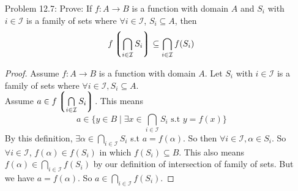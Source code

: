 \documentclass{article}
\theoremstyle{claim}
\theoremstyle{definition}
\begin{document}
\begin{enumerate}
\begin{enumerate}
\begin{proof}
                \end{proof}
            \item Prove that if $T_1 \subseteq T_2$, then $f^{-1}(T_1) \subseteq f^{-1}(T_2)$.
                \begin{proof}
                    Let $f: A \rightarrow B$ be a function. Let $T_1, T_2 \subseteq B$.\\
                    Assume $T_1 \subseteq T_2$. We want to show: If $x \in f^{-1}(T_1)$, then $x \in f^{-1}(T_2)$. By definition
                    \begin{gather*}
                        f^{-1}(T_1) = \{ x \in A \mid f(x) \in T_1 \}\\
                        f^{-1}(T_2) = \{ x \in A \mid f(x) \in T_2 \}
                    \end{gather*}
                    Assume $x \in f^{-1}(T_1)$. This means $f(x) \in T_1$. But since $T_1 \subseteq T_2$, $f(x) \in T_2$. But then that also means $x \in f^{-1}(T_2)$. Thus $f^{-1}(T_1) \subseteq f^{-1}(T_2)$.
                \end{proof}
        \end{enumerate}
    \item[Problem 12.7:] Prove: If $f : A \rightarrow B$ is a function with domain $A$ and $S_i$ with $i \in \mathcal{I}$ is a family of sets where $\forall i \in \mathcal{I}$, $S_i \subseteq A$, then
        \begin{equation*}
            f \left \lgroup \bigcap\limits_{i \in \mathcal{I}} S_i \right \rgroup \subseteq \bigcap\limits_{i \in \mathcal{I}} f(S_i)
        \end{equation*}
        \begin{proof}
            Assume $f: A \rightarrow B$ is a function with domain $A$. Let $S_i$ with $i \in \mathcal{I}$ is a family of sets where $\forall i \in \mathcal{I}, S_i \subseteq A$.\\
            Assume $a \in f \left \lgroup \bigcap\limits_{i \in \mathcal{I}} S_i \right \rgroup$. This means
                    \begin{equation*}
                        a \in \{ y \in B \mid \exists x \in \bigcap\limits_{i \in \mathcal{I}} S_i \text{ s.t } y = f(x) \}
                    \end{equation*}
                    By this definition, $\exists \alpha \in \bigcap\limits_{i \in \mathcal{I}} S_i $ s.t $a = f(\alpha)$. So then $\forall i \in \mathcal{I}, \alpha \in S_i$. So $\forall i \in \mathcal{I}$, $f(\alpha) \in f(S_i)$ in which $f(S_i) \subseteq B$. This also means $f(\alpha) \in \bigcap\limits_{i \in \mathcal{I}} f(S_i)$ by our definition of intersection of family of sets. But we have $a = f(\alpha)$. So $a \in \bigcap\limits_{i \in \mathcal{I}} f(S_i)$. 

        \end{proof}
\end{enumerate}
\end{document}
